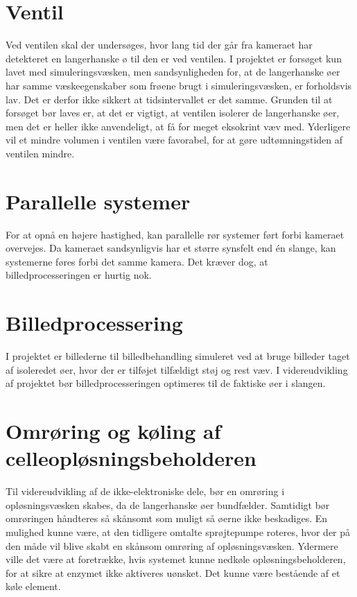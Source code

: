 \section{Ventil}
Ved ventilen skal der undersøges, hvor lang tid der går fra kameraet har detekteret en langerhanske ø til den er ved ventilen. I projektet er forsøget kun lavet med simuleringsvæsken, men sandsynligheden for, at de langerhanske øer har samme væskeegenskaber som frøene brugt i simuleringsvæsken, er forholdsvis lav. Det er derfor ikke sikkert at tidsintervallet er det samme. Grunden til at forsøget bør laves er, at det er vigtigt, at ventilen isolerer de langerhanske øer, men det er heller ikke anvendeligt, at få for meget eksokrint væv med. Yderligere vil et mindre volumen i ventilen være favorabel, for at gøre udtømningstiden af ventilen mindre.   

\section{Parallelle systemer}
For at opnå en højere hastighed, kan parallelle rør systemer ført forbi kameraet overvejes.
Da kameraet sandsynligvis har et større synsfelt end én slange, kan systemerne føres forbi det samme kamera. Det kræver dog, at billedprocesseringen er hurtig nok.

\section{Billedprocessering}
I projektet er billederne til billedbehandling simuleret ved at bruge billeder taget af isoleredet øer, hvor der er tilføjet tilfældigt støj og rest væv. I videreudvikling af projektet bør billedprocesseringen optimeres til de faktiske øer i slangen.

\section{Omrøring og køling af celleopløsningsbeholderen}
Til videreudvikling af de ikke-elektroniske dele, bør en omrøring i opløsningsvæsken skabes, da de langerhanske øer bundfælder. Samtidigt bør omrøringen håndteres så skånsomt som muligt så øerne ikke beskadiges. En mulighed kunne være, at den tidligere omtalte sprøjtepumpe roteres, hvor der på den måde vil blive skabt en skånsom omrøring af opløsningsvæsken. Ydermere ville det være at foretrække, hvis systemet kunne nedkøle opløsningsbeholderen, for at sikre at enzymet ikke aktiveres uønsket. Det kunne være bestående af et køle element. 

